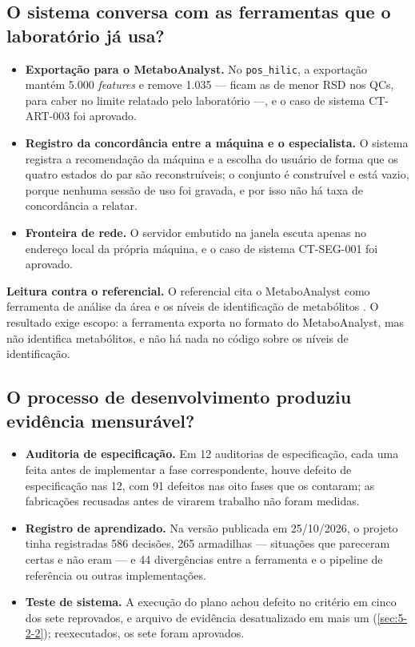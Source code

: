 \subsection{O sistema conversa com as ferramentas que o laboratório já usa?}\label{sec:5-3-5}

\begin{itemize}
\item \textbf{Exportação para o MetaboAnalyst.} No \texttt{pos\_\allowbreak{}hilic}, a exportação mantém 5.000 \textit{features} e remove 1.035 --- ficam as de menor RSD nos QCs, para caber no limite relatado pelo laboratório ---, e o caso de sistema CT-ART-003 foi aprovado.
\item \textbf{Registro da concordância entre a máquina e o especialista.} O sistema registra a recomendação da máquina e a escolha do usuário de forma que os quatro estados do par são reconstruíveis; o conjunto é construível e está vazio, porque nenhuma sessão de uso foi gravada, e por isso não há taxa de concordância a relatar.
\item \textbf{Fronteira de rede.} O servidor embutido na janela escuta apenas no endereço local da própria máquina, e o caso de sistema CT-SEG-001 foi aprovado.
\end{itemize}


\textbf{Leitura contra o referencial.} O referencial cita o MetaboAnalyst como ferramenta de análise da área \cite{pang2024metaboanalyst} e os níveis de identificação de metabólitos \cite{sumner2007proposed}. O resultado exige escopo: a ferramenta exporta no formato do MetaboAnalyst, mas não identifica metabólitos, e não há nada no código sobre os níveis de identificação.

\subsection{O processo de desenvolvimento produziu evidência mensurável?}\label{sec:5-3-6}

\begin{itemize}
\item \textbf{Auditoria de especificação.} Em 12 auditorias de especificação, cada uma feita antes de implementar a fase correspondente, houve defeito de especificação nas 12, com 91 defeitos nas oito fases que os contaram; as fabricações recusadas antes de virarem trabalho não foram medidas.
\item \textbf{Registro de aprendizado.} Na versão publicada em 25/10/2026, o projeto tinha registradas 586 decisões, 265 armadilhas --- situações que pareceram certas e não eram --- e 44 divergências entre a ferramenta e o pipeline de referência ou outras implementações.
\item \textbf{Teste de sistema.} A execução do plano achou defeito no critério em cinco dos sete reprovados, e arquivo de evidência desatualizado em mais um (\ref{sec:5-2-2}); reexecutados, os sete foram aprovados.
\end{itemize}

